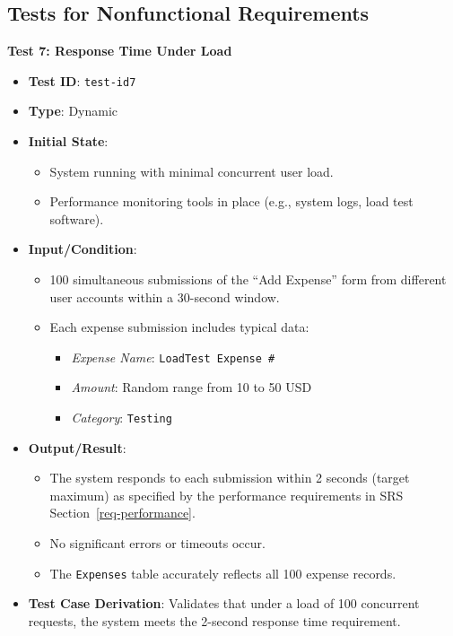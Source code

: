 \documentclass[12pt, titlepage]{article}
\begin{document}
\subsection{Tests for Nonfunctional Requirements}


\textbf{Test 7: Response Time Under Load}
\begin{itemize}
    \item \textbf{Test ID}: \texttt{test-id7}
    \item \textbf{Type}: Dynamic
    \item \textbf{Initial State}:
    \begin{itemize}
        \item System running with minimal concurrent user load.
        \item Performance monitoring tools in place (e.g., system logs, load test software).
    \end{itemize}
    \item \textbf{Input/Condition}:
    \begin{itemize}
        \item 100 simultaneous submissions of the ``Add Expense'' form from different user accounts within a 30-second window.
        \item Each expense submission includes typical data:
        \begin{itemize}
            \item \textit{Expense Name}: \texttt{LoadTest Expense \#}
            \item \textit{Amount}: Random range from 10 to 50 USD
            \item \textit{Category}: \texttt{Testing}
        \end{itemize}
    \end{itemize}
    \item \textbf{Output/Result}:
    \begin{itemize}
        \item The system responds to each submission within 2 seconds (target maximum) as specified by the performance requirements in SRS Section~\ref{req-performance}.
        \item No significant errors or timeouts occur.
        \item The \texttt{Expenses} table accurately reflects all 100 expense records.
    \end{itemize}
    \item \textbf{Test Case Derivation}:
    Validates that under a load of 100 concurrent requests, the system meets the 2-second response time requirement.

\end{itemize}
\end{document}
